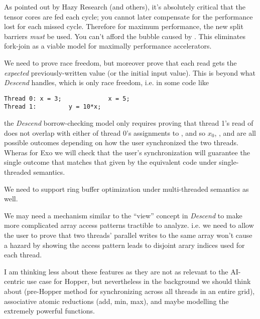 \filbreak
{} As pointed out by Hazy Research (and others), it's absolutely critical that the tensor cores are fed each cycle; you cannot later compensate for the performance lost for each missed cycle. Therefore for maximum performance, the new split barriers \textit{must} be used. You can't afford the bubble caused by . This eliminates fork-join as a viable model for maximally performance accelerators.

\filbreak
{} We need to prove race freedom, but moreover prove that each read gets the \textit{expected} previously-written value (or the initial input value). This is beyond what \textit{Descend} handles, which is only race freedom, i.e. in some code like

{\color{lightttColor}
\begin{verbatim}
Thread 0: x = 3;             x = 5;
Thread 1:         y = 10*x;
\end{verbatim}
}

the \textit{Descend} borrow-checking model only requires proving that thread 1's read of  does not overlap with either of thread 0's assignments to , and so $x_0$, , and  are all possible outcomes depending on how the user synchronized the two threads. Wheras for Exo we will check that the user's synchronization will guarantee the single outcome that matches that given by the equivalent code under single-threaded semantics.

\filbreak
{} We need to support ring buffer optimization under multi-threaded semantics as well.

\filbreak
{} We may need a mechanism similar to the ``view'' concept in \textit{Descend} to make more complicated array access patterns tractible to analyze. i.e. we need to allow the user to prove that two threads' parallel writes to the same array won't cause a hazard by showing the access pattern leads to disjoint arary indices used for each thread.

\filbreak
{} I am thinking less about these features as they are not as relevant to the AI-centric use case for Hopper, but nevertheless in the background we should think about  (pre-Hopper method for synchronizing across all threads in an entire grid), associative atomic reductions (add, min, max), and maybe modelling the extremely powerful  functions.

